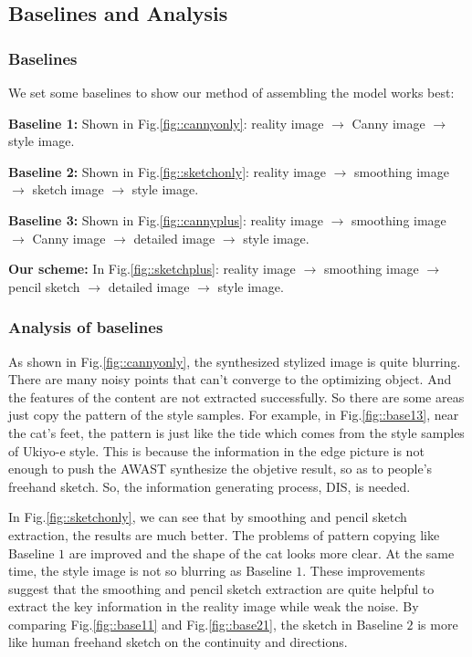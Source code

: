 \documentclass[10pt,twocolumn,letterpaper]{article}
\begin{document}
\subsection{Baselines and Analysis}

\subsubsection{Baselines}
We set some baselines to show our method of assembling the model works best:

\textbf{Baseline 1:} Shown in Fig.\ref{fig::cannyonly}: reality image $\rightarrow$ Canny image $\rightarrow$ style image.

\textbf{Baseline 2:} Shown in Fig.\ref{fig::sketchonly}: reality image $\rightarrow$ smoothing image $\rightarrow$ sketch image $\rightarrow$ style image.

\textbf{Baseline 3:} Shown in Fig.\ref{fig::cannyplus}: reality image $\rightarrow$ smoothing image $\rightarrow$ Canny image $\rightarrow$ detailed image $\rightarrow$ style image.

\textbf{Our scheme:} In Fig.\ref{fig::sketchplus}: reality image $\rightarrow$ smoothing image $\rightarrow$ pencil sketch $\rightarrow$ detailed image $\rightarrow$ style image.

\subsubsection{Analysis of baselines}
As shown in Fig.\ref{fig::cannyonly}, the synthesized stylized image is quite blurring. There are many noisy points that can't converge to the optimizing object. And the features of the content are not extracted successfully. So there are some areas just copy the pattern of the style samples. For example, in Fig.\ref{fig::base13}, near the cat's feet, the pattern is just like the tide which comes from the style samples of Ukiyo-e style. This is because the information in the edge picture is not enough to push the AWAST synthesize the objetive result, so as to people's freehand sketch. So, the information generating process, DIS, is needed.

In Fig.\ref{fig::sketchonly}, we can see that by smoothing and pencil sketch extraction, the results are much better. The problems of pattern copying like Baseline $1$ are improved and the shape of the cat looks more clear. At the same time, the style image is not so blurring as Baseline $1$. These improvements suggest that the smoothing and pencil sketch extraction are quite helpful to extract the key information in the reality image while weak the noise. By comparing Fig.\ref{fig::base11} and Fig.\ref{fig::base21}, the sketch in Baseline $2$ is more like human freehand sketch on the continuity and directions.
\end{document}
